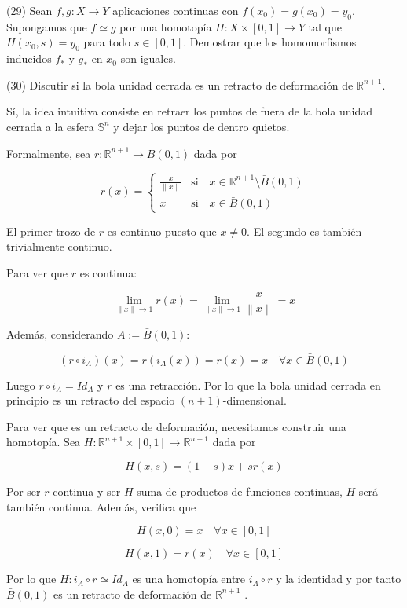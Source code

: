\documentclass[
  a4paper,
  spanish,
  12pt,
]{scrartcl}
\newcommand{\norm}[1]{\left \lVert #1 \right \rVert}
\begin{document}
\begin{ejer}
(29) Sean $f, g: X \rightarrow Y$ aplicaciones continuas con $f\left(x_{0}\right)=g\left(x_{0}\right)=y_{0}$. Supongamos que $f \simeq g$ por una homotopía $H: X \times[0,1] \rightarrow Y$ tal que $H\left(x_{0}, s\right)=y_{0}$ para todo $s \in[0,1]$. Demostrar que los homomorfismos inducidos $f_{*}$ y $g_{*}$ en $x_{0}$ son iguales.\\
\end{ejer}

\begin{ejer}
(30) Discutir si la bola unidad cerrada es un retracto de deformación de $\mathbb{R}^{n+1}$.\\
\end{ejer}

\begin{sol}
Sí, la idea intuitiva consiste en retraer los puntos de fuera de la bola unidad cerrada a la esfera $\mathbb{S}^n$ y dejar
los puntos de dentro quietos.

Formalmente, sea $r: \mathbb{R}^{n+1} \rightarrow \bar{B}(0,1)$ dada por 

$$
r(x) = \begin{cases}
	\frac{x}{\norm{x}} & \text{si} \quad x \in \mathbb{R}^{n+1} \setminus \bar{B}(0,1) \\
	x				   &  \text{si} \quad x \in \bar{B}(0,1)
\end{cases}
$$

El primer trozo de $r$ es continuo puesto que $x \neq 0$. El segundo es también trivialmente continuo.

Para ver que $r$ es continua:

$$
\lim \limits_{\norm{x} \to 1} r(x) = \lim \limits_{\norm{x} \to 1} \frac{x}{\norm{x}} = x
$$

Además, considerando $A := \bar{B}(0, 1)$:

$$
(r \circ i_A)(x) = r(i_A(x)) = r(x) = x \quad \forall x \in \bar{B}(0,1)
$$

Luego $r \circ i_A = Id_A$ y $r$ es una retracción. Por lo que la bola unidad cerrada
en principio es un retracto del espacio $(n+1)$-dimensional.

Para ver que es un retracto de deformación, necesitamos construir una homotopía.
Sea $H:  \mathbb{R}^{n+1} \times [0,1] \rightarrow \mathbb{R}^{n+1}$ dada por

$$
H(x, s) = (1-s)x + sr(x)
$$

Por ser $r$ continua y ser $H$ suma de productos de funciones continuas, $H$ será
también continua. Además, verifica que

$$
H(x, 0) = x \quad \forall x \in [0,1]
$$

$$
H(x, 1) = r(x) \quad \forall x \in [0,1]
$$

Por lo que $H: i_A \circ r \simeq Id_A$ es una homotopía entre $i_A \circ r$ y la identidad
y por tanto $\bar{B}(0, 1)$ es un retracto de deformación de  $\mathbb{R}^{n+1}$ .


\end{sol}
\end{document}
